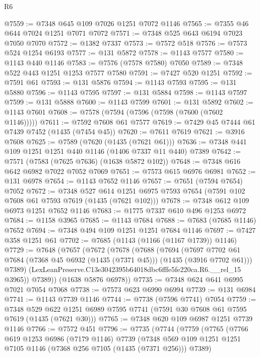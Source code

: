 \begin{lexlean}{R6}
\begin{coremodule}
@7559 := @7348 @645 @109 @7026 @1251 @7072 @1146
@7565 := @7355 @46 @644 @7024 @1251 @7071 @7072
@7571 := @7348 @525 @643 @6194 @7023 @7050 @7070
@7572 := @1382 @7337
@7573 := @7572 @518
@7576 := @7573 @524 @1254 @6193
@7577 := @131 @5872
@7578 := @1143 @7577
@7580 := @1143 @440 @1146
@7583 := @7576 (@7578 @7580) @7050
@7589 := @7348 @522 @443 @1251 @1253 @7577 @7580
@7591 := @7427 @520 @1251
@7592 := @7591 @61
@7593 := @131 @5876
@7594 := @1143 @7593
@7595 := @131 @5880
@7596 := @1143 @7595
@7597 := @131 @5884
@7598 := @1143 @7597
@7599 := @131 @5888
@7600 := @1143 @7599
@7601 := @131 @5892
@7602 := @1143 @7601
@7608 := @7578 (@7594 (@7596 (@7598 (@7600 (@7602 @1146)))))
@7611 := @7592 @7608 @61 @7577
@7619 := @7429 @45 @7444 @61 @7439 @7452 (@1435 (@7454 @45))
@7620 := @7611 @7619
@7621 := @3916 @7608
@7625 := @7589 (@7620 (@1435 (@7621 @61)))
@7636 := @7348 @441 @109 @1251 @1251 @440 @1146 (@1406 @7337 @11 @440) @7389
@7642 := @7571 (@7583 (@7625 @7636) (@1638 @5872 @102))
@7648 := @7348 @616 @642 @6982 @7022 @7052 @7069
@7651 := @7573 @615 @6976 @6981
@7652 := @131 @6978
@7654 := @1143 @7652 @1146
@7657 := @7651 (@7594 @7654) @7052
@7672 := @7348
    @527
    @614
    @1251
    @6975
    @7593
    @7654
    (@7591 @102 @7608 @61 @7593 @7619 (@1435 (@7621 @102)))
@7678 := @7348 @612 @109 @6973 @1251 @7652 @1146
@7683 := @1775 @7337 @610 @496 @1253 @6972
@7684 := @1158 @3965
@7685 := @1143 @7684
@7688 := @7683 (@7685 @1146) @7652
@7694 := @7348 @494 @109 @1251 @1251 @7684 @1146
@7697 := @7427 @358 @1251 @61
@7702 := @7685 (@1143 (@1166 (@1167 @1739)) @1146)
@7729 := @7648
    (@7657
      (@7672
        (@7678
          (@7688
            (@7694
              (@7697
                @7702
                @61
                @7684
                (@7368 @45 @6932 (@1435 (@7371 @45)))
                (@1435 (@3916 @7702 @61)))
              @7389)
            (LexLeanPreserve.C13e3042395b64018dbc6fffe5fe220ca.R6.__rel_15 @3965))
          @7389))
      (@1638 @5876 @6978))
@7735 := @7348 @624 @641 @6995 @7021 @7054 @7068
@7738 := @7573 @623 @6990 @6994
@7739 := @131 @6984
@7741 := @1143 @7739 @1146
@7744 := @7738 (@7596 @7741) @7054
@7759 := @7348
    @529
    @622
    @1251
    @6989
    @7595
    @7741
    (@7591 @30 @7608 @61 @7595 @7619 (@1435 (@7621 @30)))
@7765 := @7348 @620 @109 @6987 @1251 @7739 @1146
@7766 := @7572 @451
@7796 := @7735
    (@7744
      (@7759
        (@7765
          (@7766
            @619
            @1253
            @6986
            (@7179 @1146)
            @7739
            (@7348 @569 @109 @1251 @1251 @7105 @1146 (@7368 @256 @7105 (@1435 (@7371 @256))) @7389)

\end{coremodule}
\end{lexlean}
